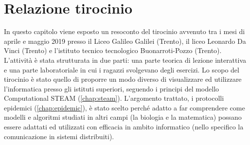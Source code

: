 \newpage
\chapter{Relazione tirocinio}
\label{cha:conclusioni}


In questo capitolo viene esposto un resoconto del tirocinio avvenuto tra i mesi di aprile e maggio 2019 presso il Liceo Galileo Galilei (Trento), il liceo Leonardo Da Vinci (Trento) e l’istituto tecnico tecnologico Buonarroti-Pozzo (Trento). L’attività è stata strutturata in due parti: una parte teorica di lezione interattiva e una parte laboratoriale in cui i ragazzi svolgevano degli esercizi. Lo scopo del tirocinio è stato quello di proporre un modo diverso di visualizzare ed utilizzare l’informatica presso gli istituti superiori, seguendo i principi del modello Computational STEAM (\autoref{chap:steam}). L’argomento trattato, i protocolli epidemici (\autoref{chap:epidemic}), è stato scelto perché adatto a far comprendere come modelli e algoritmi studiati in altri campi (la biologia e la matematica) possano essere adattati ed utilizzati con efficacia in ambito informatico (nello specifico la comunicazione in sistemi distribuiti).
